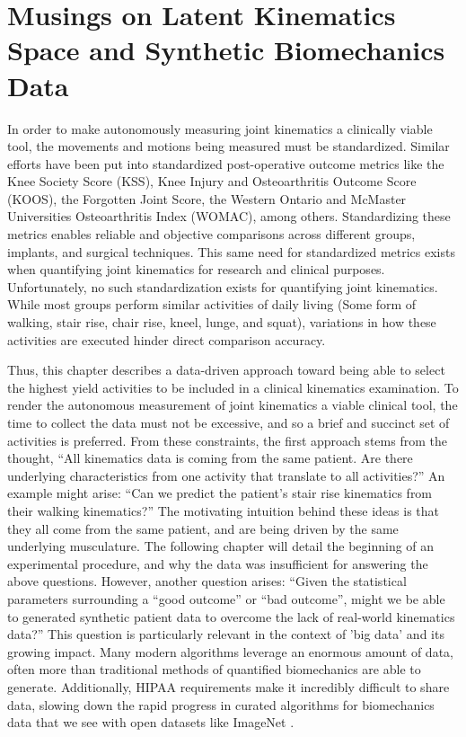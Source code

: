 \chapter{Musings on Latent Kinematics Space and Synthetic Biomechanics Data}

In order to make autonomously measuring joint kinematics a clinically viable tool, the movements and motions being measured must be standardized.
Similar efforts have been put into standardized post-operative outcome metrics like the Knee Society Score (KSS), Knee Injury and Osteoarthritis Outcome Score (KOOS), the Forgotten Joint Score, the Western Ontario and McMaster Universities Osteoarthritis Index (WOMAC), among others.
Standardizing these metrics enables reliable and objective comparisons across different groups, implants, and surgical techniques.
This same need for standardized metrics exists when quantifying joint kinematics for research and clinical purposes.
Unfortunately, no such standardization exists for quantifying joint kinematics.
While most groups perform similar activities of daily living (Some form of walking, stair rise, chair rise, kneel, lunge, and squat), variations in how these activities are executed hinder direct comparison accuracy.

Thus, this chapter describes a data-driven approach toward being able to select the highest yield activities to be included in a clinical kinematics examination.
To render the autonomous measurement of joint kinematics a viable clinical tool, the time to collect the data must not be excessive, and so a brief and succinct set of activities is preferred.
From these constraints, the first approach stems from the thought, ``All kinematics data is coming from the same patient. Are there underlying characteristics from one activity that translate to all activities?''
An example might arise: ``Can we predict the patient's stair rise kinematics from their walking kinematics?''
The motivating intuition behind these ideas is that they all come from the same patient, and are being driven by the same underlying musculature.
The following chapter will detail the beginning of an experimental procedure, and why the data was insufficient for answering the above questions.
However, another question arises: ``Given the statistical parameters surrounding a ``good outcome'' or ``bad outcome'', might we be able to generated synthetic patient data to overcome the lack of real-world kinematics data?''
This question is particularly relevant in the context of 'big data' and its growing impact.
Many modern algorithms leverage an enormous amount of data, often more than traditional methods of quantified biomechanics are able to generate.
Additionally, HIPAA requirements make it incredibly difficult to share data, slowing down the rapid progress in curated algorithms for biomechanics data that we see with open datasets like ImageNet \cite{russakovskyImageNetLargeScale2015}.

